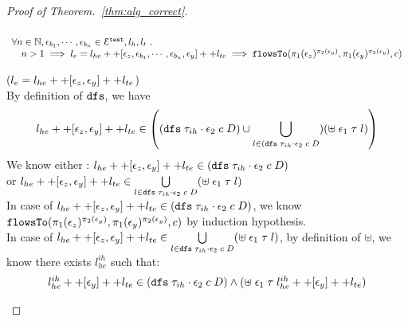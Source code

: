 \begin{proof}[Proof of Theorem.~\ref{thm:alg_correct}]
\begin{case}
\begin{equation}
  \end{equation}
%
%
\begin{equation}
\begin{array}{l}
  \forall n \in \mathbb{N}, \mathtt{\epsilon}_{b_1}, \cdots, \mathtt{\epsilon}_{b_n} \in \mathcal{E}^{\mathtt{{test}}}, l_h, l_t ~.~
   \\ \quad 
   n > 1 \implies
   l_e = l_{he} ++ {[\mathtt{\epsilon}_z, \mathtt{\epsilon}_{b_1}, \cdots, \mathtt{\epsilon}_{b_n}, \mathtt{\epsilon}_y]} ++ l_{te}
  \implies \mathtt{flowsTo}(\pi_1(\mathtt{\epsilon}_z)^{\pi_2(\mathtt{\epsilon}_y)}, \pi_1(\mathtt{\epsilon}_y)^{\pi_2(\mathtt{\epsilon}_y)}, c)
\end{array}
\end{equation}
%
\begin{subcase}($l_e = l_{he} ++ [\mathtt{\epsilon}_z, \mathtt{\epsilon}_y] ++ l_{te}$)
\\
By definition of $\mathtt{dfs}$, we have
%
\[
  l_{he} ++ [\event_z, \event_y] ++ l_{te}  \in 
  \left(  (\kw{dfs} \eapp {\trace_{ih} \cdot \event_2} \eapp c \eapp D ) \cup
  \bigcup\limits_{l \in (\kw{dfs} \eapp {\trace_{ih} \cdot \event_2} \eapp c \eapp D } )(\uplus \eapp \event_1 \eapp \trace \eapp l)
  \right)
\]
We know either :
$l_{he} ++ [\mathtt{\epsilon}_z, \mathtt{\epsilon}_y] ++ l_{te}  \in (\mathtt{dfs} \; {\mathtt{\tau}_{ih} \cdot \mathtt{\epsilon}_2} \; c \; D )$
\\
or $l_{he} ++ [\mathtt{\epsilon}_z, \mathtt{\epsilon}_y] ++ l_{te}  \in  
\bigcup\limits_{l \in \mathtt{dfs} \; {\mathtt{\tau}_{ih} \cdot \mathtt{\epsilon}_2} \; c \; D } (\uplus \; \mathtt{\epsilon}_1 \; \mathtt{\tau} \; l)$
\\
In case of $l_{he} ++ [\mathtt{\epsilon}_z, \mathtt{\epsilon}_y] ++ l_{te}  \in (\mathtt{dfs} \; {\mathtt{\tau}_{ih} \cdot \mathtt{\epsilon}_2} \; c \; D )$, we know 
$\mathtt{flowsTo}(\pi_1(\mathtt{\epsilon}_z)^{\pi_2(\mathtt{\epsilon}_y)}, \pi_1(\mathtt{\epsilon}_y)^{\pi_2(\mathtt{\epsilon}_y)}, c)$ by induction hypothesis.
\\
%
In case of $l_{he} ++ [\mathtt{\epsilon}_z, \mathtt{\epsilon}_y] ++ l_{te}  \in  
\bigcup\limits_{l \in \mathtt{dfs} \; {\mathtt{\tau}_{ih} \cdot \mathtt{\epsilon}_2} \; c \; D } (\uplus \; \mathtt{\epsilon}_1 \; \mathtt{\tau} \; l)$,
by definition of $\uplus$, we know there exists $l^{ih}_{he}$ such that:
\[
\begin{array}{l}
  l^{ih}_{he} ++ [\mathtt{\epsilon}_y] ++ l_{te} \in (\mathtt{dfs} \; {\mathtt{\tau}_{ih} \cdot \mathtt{\epsilon}_2} \; c \; D )
  \land
  (\uplus \; \mathtt{\epsilon}_1 \; \mathtt{\tau} \;  l^{ih}_{he} ++ [\mathtt{\epsilon}_y] ++ l_{te}) 

\end{array}\]
\end{subcase}
\end{case}
\end{proof}
